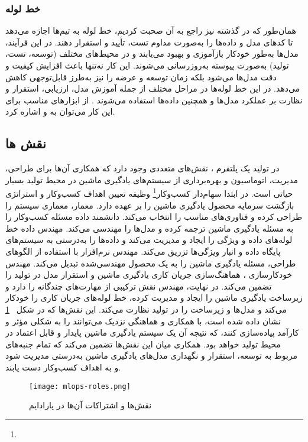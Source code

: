 \subsubsection{خط لوله }
همان‌طور که در گذشته نیز راجع به آن صحبت کردیم، خط لوله  به تیم‌ها اجازه می‌دهد تا کدهای مدل و داده‌ها را به‌صورت مداوم تست، تأیید و استقرار دهند. در این فرآیند، مدل‌ها به‌طور خودکار بازآموزی و بهبود می‌یابند و در محیط‌های مختلف (توسعه، تست، تولید) به‌صورت پیوسته به‌روزرسانی می‌شوند. این کار نه‌تنها باعث افزایش کیفیت و دقت مدل‌ها می‌شود بلکه زمان توسعه و عرضه را نیز به‌طرز قابل‌توجهی کاهش می‌دهد. در  این خط لوله‌ها در مراحل مختلف از جمله آموزش مدل، ارزیابی، استقرار و نظارت بر عملکرد مدل‌ها و همچنین داده‌ها استفاده می‌شوند \cite{MLOpsProd2}. از ابزارهای مناسب برای این کار می‌توان به \cite{Jenkins} و \cite{GitLab} اشاره کرد.


\subsection{نقش ها}
در تولید یک پلتفرم ، نقش‌های متعددی وجود دارد که همکاری آن‌ها برای طراحی، مدیریت، اتوماسیون و بهره‌برداری از سیستم‌های یادگیری ماشین در محیط تولید بسیار حیاتی است. در ابتدا سهام‌دار کسب‌وکار\footnote{} وظیفه تعیین اهداف کسب‌وکار و استراتژی بازگشت سرمایه محصول یادگیری ماشین را بر عهده دارد. معمار، معماری سیستم را طراحی کرده و فناوری‌های مناسب را انتخاب می‌کند. دانشمند داده مسئله کسب‌وکار را به مسئله یادگیری ماشین ترجمه کرده و مدل‌ها را مهندسی می‌کند. مهندس داده خط لوله‌های داده و ویژگی را ایجاد و مدیریت می‌کند و داده‌ها را به‌درستی به سیستم‌های پایگاه داده و انبار ویژگی‌ها تزریق می‌کند. مهندس نرم‌افزار با استفاده از الگوهای طراحی، مسئله یادگیری ماشین را به یک محصول مهندسی‌شده تبدیل می‌کند. مهندس  خودکارسازی ، هماهنگ‌سازی جریان کاری یادگیری ماشین و استقرار مدل در تولید را تضمین می‌کند. در نهایت، مهندس  نقش ترکیبی از مهارت‌های چندگانه را دارد و زیرساخت یادگیری ماشین را ایجاد و مدیریت کرده، خط لوله‌های جریان کاری را خودکار می‌کند و مدل‌ها و زیرساخت را در تولید نظارت می‌کند. این نقش‌ها که در شکل 
~\ref{fig: mlops roles}
نشان داده شده است، با همکاری و هماهنگی نزدیک می‌توانند  را به شکلی مؤثر و کارآمد پیاده‌سازی کنند، که نتیجه آن یک سیستم یادگیری ماشین پایدار و قابل اعتماد در محیط تولید خواهد بود. همکاری میان این نقش‌ها تضمین می‌کند که تمام جنبه‌های مربوط به توسعه، استقرار و نگهداری مدل‌های یادگیری ماشین به‌درستی مدیریت شود و به اهداف کسب‌وکار دست یابند.
\begin{figure}[t]
	\centering
	\texttt{[image: mlops-roles.png]}
	\caption{نقش‌ها و اشتراکات آن‌ها در پارادایم }
	\label{fig: mlops roles}
\end{figure}


